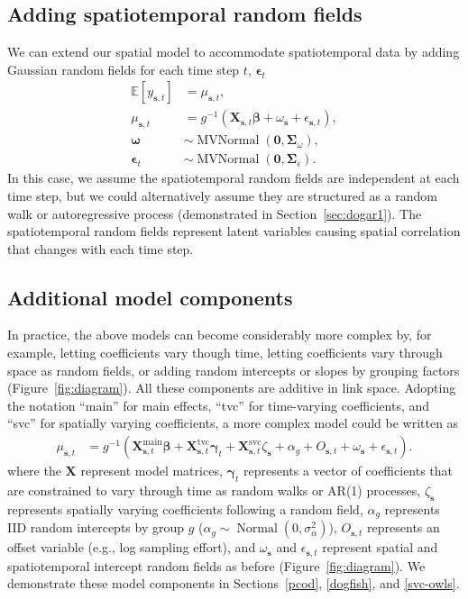 \documentclass[article]{jss}\usepackage[]{graphicx}\usepackage[dvipsnames]{xcolor}
\begin{document}
\subsection{Adding spatiotemporal random fields}

We can extend our spatial model to accommodate spatiotemporal data by adding Gaussian random fields for each time step $t$, $\bm{\epsilon}_{t}$
\[
\begin{aligned}
\mathbb{E}[y_{\bm{s},t}] &= \mu_{\bm{s},t},\\
\mu_{\bm{s},t} &=
g^{-1} \left( \bm{X}_{\bm{s},t} \bm{\beta} + \omega_{\bm{s}} + \epsilon_{\bm{s},t} \right),\\
\bm{\omega} &\sim \operatorname{MVNormal} \left( \bm{0}, \bm{\Sigma}_\omega \right),\\
\bm{\epsilon}_{t} &\sim \operatorname{MVNormal} \left( \bm{0}, \bm{\Sigma}_{\epsilon} \right).
\end{aligned}
\]
In this case, we assume the spatiotemporal random fields are independent at each time step, but we could alternatively assume they are structured as a random walk or autoregressive process (demonstrated in Section~\ref{sec:dogar1}).
The spatiotemporal random fields represent latent variables causing spatial correlation that changes with each time step.

\subsection{Additional model components}

In practice, the above models can become considerably more complex by, for example, letting coefficients vary though time, letting coefficients vary through space \citep{hastie1993} as random fields, or adding random intercepts or slopes by grouping factors (Figure~\ref{fig:diagram}).
All these components are additive in link space.
Adopting the notation ``main'' for main effects, ``tvc'' for time-varying coefficients, and ``svc'' for spatially varying coefficients, a more complex model could be written as
\[
\begin{aligned}
\mu_{\bm{s},t} &=
g^{-1} \left( \bm{X}^{\mathrm{main}}_{\bm{s},t} \bm{\beta} +
\bm{X}^{\mathrm{tvc}}_{\bm{s},t} \bm{\gamma}_t +
\bm{X}^{\mathrm{svc}}_{\bm{s},t} \zeta_{\bm{s}} +
\alpha_g +
O_{\bm{s},t} +
\omega_{\bm{s}} +
\epsilon_{\bm{s},t} \right).
\end{aligned}
\]
where the $\bm{X}$ represent model matrices, $\bm{\gamma}_t$ represents a vector of coefficients that are constrained to vary through time as random walks or AR(1) processes, $\zeta_{\bm{s}}$ represents spatially varying coefficients following a random field, $\alpha_g$ represents IID random intercepts by group $g$ ($\alpha_g \sim \operatorname{Normal} \left(0, \sigma_\alpha^2 \right)$), $O_{\bm{s},t}$ represents an offset variable \citep[][p.~206]{mccullagh1989} (e.g., log sampling effort), and $\omega_{\bm{s}}$ and $\epsilon_{\bm{s},t}$ represent spatial and spatiotemporal intercept random fields as before (Figure~\ref{fig:diagram}).
We demonstrate these model components in Sections~\ref{pcod}, \ref{dogfish}, and \ref{svc-owls}.
\end{document}
